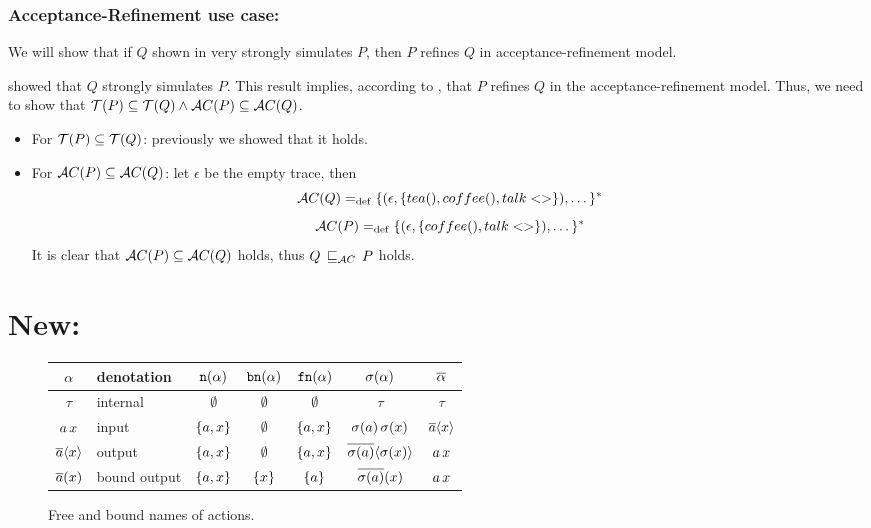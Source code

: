 \subsubsection{Acceptance-Refinement use case:}
 We will show that if $Q$ shown in  very strongly simulates $P$, then $P$ refines $Q$ in acceptance-refinement model.
 
  showed that $Q$ strongly simulates $P$. This result implies, according to , that $P$ refines $Q$ in the acceptance-refinement model. Thus, we need to show that $\Traces[P]\subseteq\Traces[Q] \wedge \Accepatances[P]\subseteq\Accepatances[Q]$.
 
 \begin{itemize}
\item For $\Traces[P]\subseteq\Traces[Q]$: previously we showed that it holds. 

\item For $\Accepatances[P]\subseteq\Accepatances[Q]$: let $\epsilon$ be the empty trace, then
    \[\Accepatances[Q] \define \{(\epsilon,\{tea(),coffee(),talk<>\}),\dots\}^\ast\]
    \[\Accepatances[P] \define \{(\epsilon,\{coffee(),talk<>\}),\dots\}^\ast\]
It is clear that $\Accepatances[P]\subseteq\Accepatances[Q]$ holds, thus $Q \refiAC P$ holds.
\end{itemize}

\section{ New:}
\begin{figure}[!h]
\centering
\begin{tabular}{c|l|c|c|c|c|c}%
$\alpha$      & denotation   & $\mathtt{n}(\alpha)$ & $\mathtt{bn}(\alpha)$ & $\mathtt{fn}(\alpha)$ & $\sigma(\alpha)$ & $\overline{\alpha}$\\\hline\hline%
$\tau$        & internal     & $\emptyset$  & $\emptyset$   & $\emptyset$   & $\tau$ & $\tau$\\%
$a\,x$  & input        & $\set{a,x}$  & $\emptyset$   & $\set{a,x}$   & $\sigma(a)\,\sigma(x)$ & $\overline{a}\langle x\rangle$\\%
$\overline{a}\langle x\rangle$  & output       & $\set{a,x}$  & $\emptyset$   & $\set{a,x}$   & $\overline{\sigma(a)}\langle\sigma(x)\rangle$ & $a\,x$\\%
$\overline{a}(x)$ & bound output & $\set{a,x}$  & $\set{x}$     & $\set{a}$     & $\overline{\sigma(a)}(x)$ & $a\,x$ %
\end{tabular}
\caption{Free and bound names of actions.}
\label{fig_names_act}
\end{figure}

